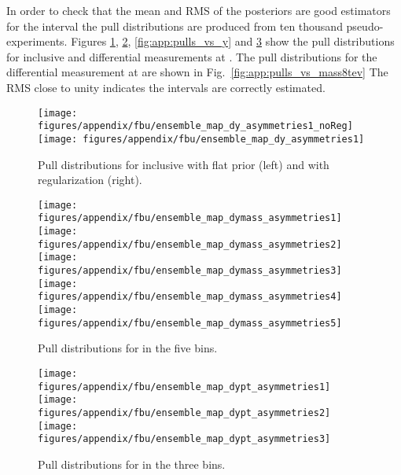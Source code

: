 In order to check that the mean and RMS of the \ac{} posteriors are
good estimators for the \ac{} interval the pull distributions are
produced from ten thousand pseudo-experiments.
Figures \ref{fig:app:pulls_inclu}, \ref{fig:app:pulls_vs_mass},
\ref{fig:app:pulls_vs_y} and \ref{fig:app:pulls_vs_pt} show the pull
distributions for inclusive and differential measurements at \seventev{}.
The pull distributions for the differential measurement at \eighttev{}
are shown in Fig.~\ref{fig:app:pulls_vs_mass8tev}
The RMS close to unity indicates the intervals are correctly estimated.

\begin{figure}
  \begin{center}
  \texttt{[image: figures/appendix/fbu/ensemble\_map\_dy\_asymmetries1\_noReg]}
  \texttt{[image: figures/appendix/fbu/ensemble\_map\_dy\_asymmetries1]}
  \caption{
    \label{fig:app:pulls_inclu}
    Pull distributions for inclusive \ac{} with flat prior (left) and with regularization (right).
  }
  \end{center}
\end{figure}

\begin{figure}
  \begin{center}
  \texttt{[image: figures/appendix/fbu/ensemble\_map\_dymass\_asymmetries1]}
  \texttt{[image: figures/appendix/fbu/ensemble\_map\_dymass\_asymmetries2]}
  \texttt{[image: figures/appendix/fbu/ensemble\_map\_dymass\_asymmetries3]}
  \texttt{[image: figures/appendix/fbu/ensemble\_map\_dymass\_asymmetries4]}
  \texttt{[image: figures/appendix/fbu/ensemble\_map\_dymass\_asymmetries5]}
  \caption{
    \label{fig:app:pulls_vs_mass}
    Pull distributions for \ac{} in the five \mtt{} bins.
  }
  \end{center}
\end{figure}

\begin{figure}
  \begin{center}
  \texttt{[image: figures/appendix/fbu/ensemble\_map\_dypt\_asymmetries1]}
  \texttt{[image: figures/appendix/fbu/ensemble\_map\_dypt\_asymmetries2]}
  \texttt{[image: figures/appendix/fbu/ensemble\_map\_dypt\_asymmetries3]}
  \caption{
    \label{fig:app:pulls_vs_pt}
    Pull distributions for \ac{} in the three \pttt{} bins.
  }
  \end{center}
\end{figure}

